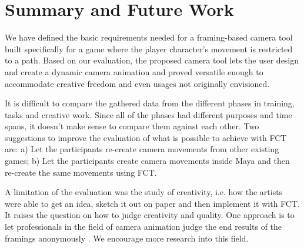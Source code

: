 \section{Summary and Future Work}
We have defined the basic requirements needed for a framing-based camera tool built specifically for a game where the player character's movement is restricted to a  path. Based on our evaluation, the proposed camera tool lets the user design and create a dynamic camera animation and proved versatile enough to accommodate creative freedom and even usages not originally envisioned. 

It is difficult to compare the gathered data from the different phases in training, tasks and creative work. Since all of the phases had different purposes and time spans, it doesn't make sense to compare them against each other. Two suggestions to improve the evaluation of what is possible to achieve with FCT are: a) Let the participants re-create camera movements from other existing games; b) Let the participants create camera movements inside Maya and then re-create the same movements using FCT.

A limitation of the evaluation was the study of creativity, i.e. how the artists were able to get an idea, sketch it out on paper and then implement it with FCT. It raises the question on how to judge creativity and quality. One approach is to let professionals in the field of camera animation judge the end results of the framings anonymously \cite{sadeghi_artist_2010}. We encourage more research into this field.
